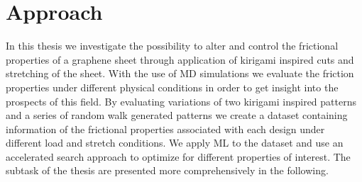 

\section{Approach}
In this thesis we investigate the possibility to alter and control the frictional
properties of a graphene sheet through application of kirigami inspired cuts and stretching of the sheet. With the use of \acrshort{MD} simulations we evaluate the friction properties under different physical conditions in order to get insight into the prospects of this field. By evaluating variations of two kirigami inspired patterns and a series of random walk generated patterns we create a dataset containing information of the frictional properties associated with each design under different load and stretch conditions. We apply \acrshort{ML} to the dataset and use an accelerated search approach to optimize for different properties of interest. The subtask of the thesis are presented more comprehensively in the following.
